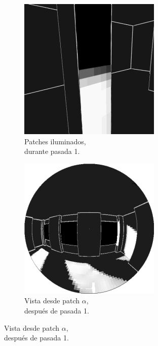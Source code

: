 \begin{figure}[H]
\begin{subfigure}{0.24\textwidth}
	\end{subfigure}%
	\begin{subfigure}{0.24\textwidth}
		\centering
		\captionsetup{width=0.95\textwidth, justification=centering}
		\caption*{Patches iluminados,\\ durante pasada 1.}
		\includegraphics[width=.95\linewidth]{media/radiosity_patch2.png}
	\end{subfigure}%
	\begin{subfigure}{0.24\textwidth}
		\centering
		\captionsetup{width=0.95\textwidth, justification=centering}
		\caption*{Vista desde patch $\alpha$,\\ después de pasada 1.}
		\includegraphics[width=.95\linewidth]{media/radiosity2_eye.png}
	\end{subfigure}
\end{figure}%
